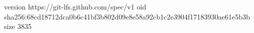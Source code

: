 version https://git-lfs.github.com/spec/v1
oid sha256:68cd18712dca0b6c41bf3b802d09e8e58a92cb1c2e3904f17183930ae61e5b3b
size 3835
